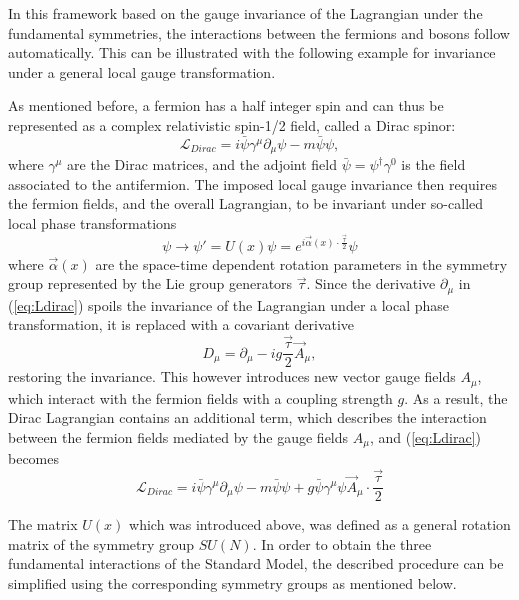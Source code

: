 In this framework based on the gauge invariance of the Lagrangian under the fundamental symmetries, the interactions between the fermions and bosons follow automatically. This can be illustrated with the following example for invariance under a general local gauge transformation.

As mentioned before, a fermion has a half integer spin and can thus be represented as a complex relativistic spin-1/2 field, called a Dirac spinor:
\begin{equation}
\label{eq:Ldirac}
 \mathcal{L}_{Dirac} = i\bar{\psi}\gamma^{\mu}\partial_{\mu}\psi - m\bar{\psi}\psi,
\end{equation}
where $\gamma^{\mu}$ are the Dirac matrices, and the adjoint field $\bar{\psi} = \psi^{\dagger}\gamma^0$ is the field associated to the antifermion. The imposed local gauge invariance then requires the fermion fields, and the overall Lagrangian, to be invariant under so-called local phase transformations
\begin{equation}
 \psi \rightarrow \psi' = U(x)\psi = e^{i\vec{\alpha}(x)\cdot\frac{\vec{\tau}}{2}}\psi
\end{equation}
where $\vec{\alpha}(x)$ are the space-time dependent rotation parameters in the symmetry group represented by the Lie group generators $\vec{\tau}$. Since the derivative $\partial_{\mu}$ in (\ref{eq:Ldirac}) spoils the invariance of the Lagrangian under a local phase transformation, it is replaced with a covariant derivative 
\begin{equation}
 D_{\mu} = \partial_{\mu} - ig\frac{\vec{\tau}}{2}\vec{A}_{\mu}, 
\end{equation}
restoring the invariance. This however introduces new vector gauge fields $A_{\mu}$, which interact with the fermion fields with a coupling strength $g$. As a result, the Dirac Lagrangian contains an additional term, which describes the interaction between the fermion fields mediated by the gauge fields $A_{\mu}$, and (\ref{eq:Ldirac}) becomes
\begin{equation}
  \mathcal{L}_{Dirac} = i\bar{\psi}\gamma^{\mu}\partial_{\mu}\psi - m\bar{\psi}\psi + g\bar{\psi}\gamma^{\mu}\psi\vec{A}_{\mu}\cdot\frac{\vec{\tau}}{2}
\end{equation}

The matrix $U(x)$ which was introduced above, was defined as a general rotation matrix of the symmetry group $SU(N)$. In order to obtain the three fundamental interactions of the Standard Model, the described procedure can be simplified using the corresponding symmetry groups as mentioned below.

